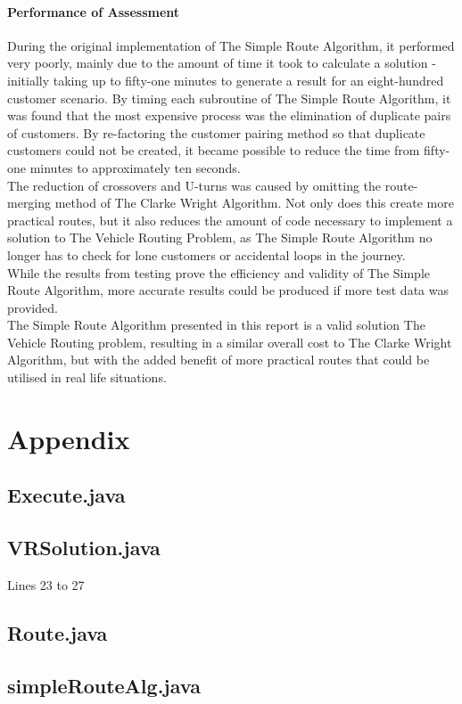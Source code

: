 \documentclass[conference]{acmsiggraph}
\begin{document}
		\paragraph{Performance of Assessment}
		During the original implementation of The Simple Route Algorithm, it performed very poorly, mainly due to the amount of time it took to calculate a solution - initially taking up to fifty-one minutes to generate a result for an eight-hundred customer scenario. By timing each subroutine of The Simple Route Algorithm, it was found that the most expensive process was the elimination of duplicate pairs of customers. By re-factoring the customer pairing method so that duplicate customers could not be created, it became possible to reduce the time from fifty-one minutes to approximately ten seconds.\\
		The reduction of crossovers and U-turns was caused by omitting the route-merging method of The Clarke Wright Algorithm. Not only does this create more practical routes, but it also reduces the amount of code necessary to implement a solution to The Vehicle Routing Problem, as The Simple Route Algorithm no longer has to check for lone customers or accidental loops in the journey.\\
		While the results from testing prove the efficiency and validity of The Simple Route Algorithm, more accurate results could be produced if more test data was provided.\\
		The Simple Route Algorithm presented in this report is a valid solution The Vehicle Routing problem, resulting in a similar overall cost to The Clarke Wright Algorithm, but with the added benefit of more practical routes that could be utilised in real life situations.
		 	
	\section{Appendix}
	
		\subsection{Execute.java}
		

		\subsection{VRSolution.java}
		Lines 23 to 27
		
		
		\subsection{Route.java}
		
		
		\subsection{simpleRouteAlg.java}
		
		
		
		
		
			
\end{document}
